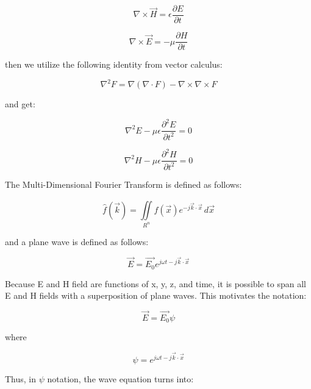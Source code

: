 \documentclass{article}
\begin{document}
\begin{equation}
	\nabla \times \vec{H} = \epsilon\frac{\partial E}{\partial t}
\end{equation}

\begin{equation}
	\nabla \times \vec{E} = -\mu\frac{\partial H}{\partial t}
\end{equation}

then we utilize the following identity from vector calculus:

\begin{equation}
	\nabla^2F = \nabla(\nabla \cdot F) - \nabla\times\nabla\times F
\end{equation}

and get:

\begin{equation}
	\nabla^2E - \mu\epsilon\frac{\partial^2 E}{\partial t^2} = 0
\end{equation}

\begin{equation}
	\nabla^2H - \mu\epsilon\frac{\partial^2 H}{\partial t^2} = 0
\end{equation}

The Multi-Dimensional Fourier Transform is defined as follows:

\begin{equation}
	\hat{f} (\vec{k}) = \iint \limits_{R^n}^{} f(\vec{x})e^{-j \vec{k} \cdot \vec{x}} \,d\vec{x}
\end{equation}

and a plane wave is defined as follows:

\begin{equation}
	\vec{E} = \vec{E_{0}}e^{j \omega t - j\vec{k} \cdot \vec{x}} 
\end{equation}

Because E and H field are functions of x, y, z, and time, it is possible to span all E and H fields with a superposition of plane waves. This motivates the notation:

\begin{equation}
	\vec{E} = \vec{E_{0}}\psi
\end{equation}

where

\begin{equation}
	\psi = e^{j \omega t - j\vec{k} \cdot \vec{x}}
\end{equation}

Thus, in \(\psi\) notation, the wave equation turns into:
\end{document}
